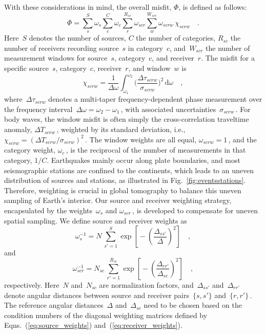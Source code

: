 \documentclass[extra,mreferee]{gji}
\begin{document}
With these considerations in mind,
the overall misfit, $\Phi$, is defined as follows:
\begin{equation}
\label{eq:misfit}
\Phi = \sum_{s}^{S} \omega_s \sum_{c}^{C} \omega_{c} \sum_{r}^{R_{sc}} \omega_{scr} \sum_{w}^{W_{scr}} \omega_{scrw}\, \chi_{scrw}
\quad .
\end{equation}
Here~$S$ denotes the number of sources, $C$ the number of categories,
$R_{sc}$ the number of receivers recording source~$s$ in category~$c$,
and~$W_{scr}$ the number of measurement windows for source~$s$, category~$c$,
and receiver~$r$.
The misfit for a specific source~$s$, category~$c$, receiver~$r$, and window~$w$ is
\begin{equation}
  \chi_{scrw} = \frac{1}{\Delta\omega}\int_{\omega_1}^{\omega_2} \Big( \frac {\Delta \tau_{scrw}} {\sigma_{scrw}} \Big)^2\, \mathrm{d}\omega
\quad ,
\end{equation}
where~$\Delta \tau_{scrw}$ denotes a multi-taper frequency-dependent phase measurement over the frequency interval~$\Delta\omega=\omega_2-\omega_1$\,,
with associated uncertainties~$\sigma_{scrw}$\,.
For body waves, the window misfit is often simply the cross-correlation traveltime anomaly,
$\Delta T_{scrw}$\,, weighted by its standard deviation, i.e., $\chi_{scrw}=(\Delta T_{scrw}/\sigma_{scrw})^2$\,.
The window weights are all equal, $\omega_{scrw}=1$\,,
and the category weight, $\omega_c$\,, is the reciprocal of the number of measurements in that
category, $1/C$.
Earthquakes mainly occur along plate boundaries,
and most seismographic  stations are confined to the continents,
which leads to an uneven distribution of sources and stations,
as illustrated in Fig.~\ref{fig:eventsstations}.
Therefore, weighting is crucial in global tomography to balance this uneven sampling
of Earth's interior.
Our source and receiver weighting strategy,
encapsulated by the weights~$\omega_s$ and $\omega_{scr}$\,,
is developed to compensate for uneven spatial sampling.
We define source and receiver weights as
\begin{equation}
\omega_{s}^{-1} = N\,\sum_{s'=1}^{S} \exp\left[\mbox{}-\left(\frac{\Delta_{ss'}}{\Delta}\right)^2\right]
\quad ,
\label{eq:source_weights}
\end{equation}
and
\begin{equation}
\omega_{scr}^{-1} = N_{sc}\,\sum_{r'=1}^{R_{sc}} \exp\left[\mbox{}-\left(\frac{\Delta_{rr'}}{\Delta_{sc}}\right)^2\right]
\quad ,
\label{eq:receiver_weights}
\end{equation}
respectively.
Here~$N$ and~$N_{sc}$ are normalization factors,
and~$\Delta_{ss'}$ and~$\Delta_{rr'}$ denote angular distances between source and receiver pairs~$\{s,s'\}$ and~$\{r,r'\}$\,.
The reference angular distances~$\Delta$ and~$\Delta_{sc}$ need to be chosen based on the condition 
numbers of the diagonal weighting matrices defined by Eqns.~(\ref{eq:source_weights}) and~(\ref{eq:receiver_weights}).
\end{document}

